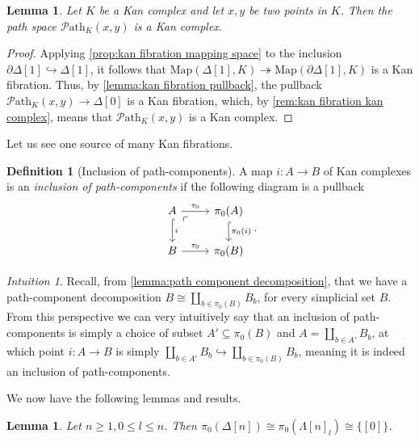 \documentclass[11pt, a4paper]{amsart}
\newcommand{\Map}{\mathrm{Map}}
\newcommand{\Path}{\mathscr{P}\mathrm{ath}}
\newtheorem{lemma}[equation]{Lemma}
\theoremstyle{definition}
\newtheorem{definition}[equation]{Definition}
\theoremstyle{remark}
\newtheorem{intuition}[equation]{Intuition}
\numberwithin{equation}{section}
\begin{document}
 \begin{lemma}
  Let $K$ be a Kan complex and let $x,y$ be two points in $K$. Then the path space $\Path_K(x,y)$ is a Kan complex.
 \end{lemma}

 \begin{proof}
  Applying \cref{prop:kan fibration mapping space} to the inclusion $\partial \Delta[1] \hookrightarrow \Delta[1]$, it follows that $\Map(\Delta[1],K) \twoheadrightarrow \Map(\partial \Delta[1],K)$ is a Kan fibration. Thus, by \cref{lemma:kan fibration pullback}, the pullback $\Path_K(x,y) \to \Delta[0]$ is a Kan fibration, which, by \cref{rem:kan fibration kan complex}, means that $\Path_K(x,y)$ is a Kan complex.
 \end{proof}
 
Let us see one source of many Kan fibrations.

\begin{definition}[Inclusion of path-components] \label{def:inclusion path components}
  A map $i\colon A \to B$ of Kan complexes is an \emph{inclusion of path-components} if the following diagram is a pullback
  \[
  \begin{tikzcd}
    A \arrow[r, "\tau_0"] \arrow[d, hookrightarrow, "i"] \arrow[dr, phantom, "\ulcorner", very near start] & \pi_0(A) \arrow[d, hookrightarrow, "\pi_0(i)"] \\
    B \arrow[r, "\tau_0"] & \pi_0(B)
  \end{tikzcd}.
  \]
\end{definition}

\begin{intuition} \label{intuition:inclusion path components}
 Recall, from \cref{lemma:path component decomposition}, that we have a path-component decomposition $B \cong \coprod_{b \in \pi_0(B)}B_b$, for every simplicial set $B$. From this perspective we can very intuitively say that an inclusion of path-components is simply a choice of subset $A' \subseteq \pi_0(B)$ and $A = \coprod_{b\in A'} B_b$, at which point $i\colon A \to B$ is simply $\coprod_{b \in A'} B_b \hookrightarrow \coprod_{b \in \pi_0(B)} B_b$, meaning it is indeed an inclusion of path-components.
\end{intuition}

We now have the following lemmas and results.

\begin{lemma} \label{lemma:delta lambda path component}
 Let $n \geq 1, 0 \leq l \leq n$. Then $\pi_0(\Delta[n]) \cong \pi_0(\Lambda[n]_l) \cong \{[0]\}$.
\end{lemma}
\end{document}
